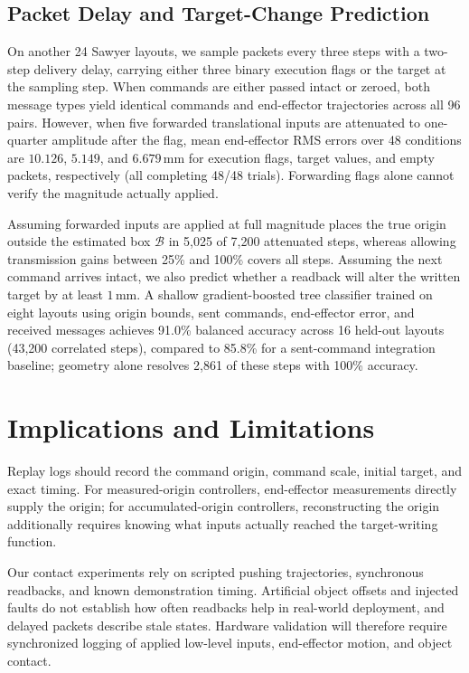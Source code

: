 \subsection{Packet Delay and Target-Change Prediction}

On another 24 Sawyer layouts, we sample packets every three steps with a two-step delivery delay, carrying either three binary execution flags or the target at the sampling step. When commands are either passed intact or zeroed, both message types yield identical commands and end-effector trajectories across all 96 pairs. However, when five forwarded translational inputs are attenuated to one-quarter amplitude after the flag, mean end-effector RMS errors over 48 conditions are $10.126$, $5.149$, and $6.679\,\text{mm}$ for execution flags, target values, and empty packets, respectively (all completing 48/48 trials). Forwarding flags alone cannot verify the magnitude actually applied.

Assuming forwarded inputs are applied at full magnitude places the true origin outside the estimated box $\mathcal{B}$ in 5,025 of 7,200 attenuated steps, whereas allowing transmission gains between 25\% and 100\% covers all steps. Assuming the next command arrives intact, we also predict whether a readback will alter the written target by at least $1\,\text{mm}$. A shallow gradient-boosted tree classifier trained on eight layouts using origin bounds, sent commands, end-effector error, and received messages achieves 91.0\% balanced accuracy across 16 held-out layouts (43,200 correlated steps), compared to 85.8\% for a sent-command integration baseline; geometry alone resolves 2,861 of these steps with 100\% accuracy.



\section{Implications and Limitations}

Replay logs should record the command origin, command scale, initial target, and exact timing. For measured-origin controllers, end-effector measurements directly supply the origin; for accumulated-origin controllers, reconstructing the origin additionally requires knowing what inputs actually reached the target-writing function.

Our contact experiments rely on scripted pushing trajectories, synchronous readbacks, and known demonstration timing. Artificial object offsets and injected faults do not establish how often readbacks help in real-world deployment, and delayed packets describe stale states. Hardware validation will therefore require synchronized logging of applied low-level inputs, end-effector motion, and object contact.

